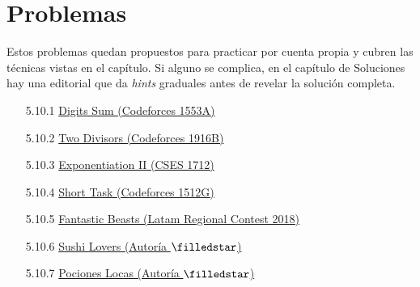 \section{Problemas}

Estos problemas quedan propuestos para practicar por cuenta propia y cubren las técnicas vistas en el capítulo. Si alguno se complica, en el capítulo de Soluciones hay una editorial que da \textit{hints} graduales antes de revelar la solución completa.

\begin{itemize}
    \item[5.10.1] \href{https://codeforces.com/problemset/problem/1553/A}{Digits Sum (Codeforces 1553A)}
    \item[5.10.2] \href{https://codeforces.com/contest/1916/problem/B}{Two Divisors (Codeforces 1916B)}
    \item[5.10.3] \href{https://cses.fi/problemset/task/1712}{Exponentiation II (CSES 1712)}
    \item[5.10.4] \href{https://codeforces.com/problemset/problem/1512/G}{Short Task (Codeforces 1512G)}
    \item[5.10.5] \href{https://matcomgrader.com/problem/9547/fantastic-beasts/}{Fantastic Beasts (Latam Regional Contest 2018)}
    \item[5.10.6] \href{https://codeforces.com/group/DH4HPwQlLU/contest/689800/problem/C}{Sushi Lovers (Autoría $\filledstar$)}
    \item[5.10.7] \href{https://codeforces.com/group/DH4HPwQlLU/contest/689800/problem/F}{Pociones Locas (Autoría $\filledstar$)}

\end{itemize}
